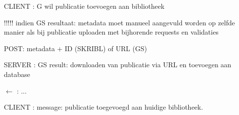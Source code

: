 \documentclass{article}
\begin{document}
\begin{description}
\item CLIENT :  G wil publicatie toevoegen aan bibliotheek
	\begin{description}
	\item !!!!!   indien GS resultaat: metadata moet manueel aangevuld worden op zelfde manier als bij publicatie uploaden met bijhorende requests en validaties
	\item POST: metadata + ID (SKRIBL) of URL (GS) 
	\end{description}
	
\item SERVER : GS result: downloaden van publicatie via URL en toevoegen aan database
	\begin{description}
	\item $\leftarrow$ :  ...
	\end{description}
		
\item CLIENT :  message: publicatie toegevoegd aan huidige bibliotheek.

 \end{description}
 
\end{document}
